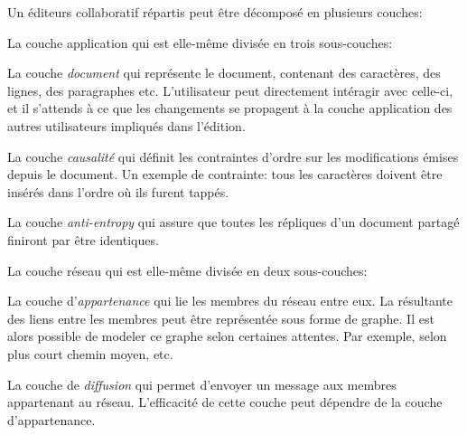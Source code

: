 Un éditeurs collaboratif répartis peut être décomposé en plusieurs couches:
\begin{asparadesc}
\item [La couche application] qui est elle-même divisée en trois sous-couches:
  \begin{inparaenum}[(i)]
  \item La couche \emph{document} qui représente le document, contenant des
    caractères, des lignes, des paragraphes etc. L'utilisateur peut directement
    intéragir avec celle-ci, et il s'attends à ce que les changements se
    propagent à la couche application des autres utilisateurs impliqués dans
    l'édition.
  \item La couche \emph{causalité} qui définit les contraintes d'ordre sur les
    modifications émises depuis le document. Un exemple de contrainte: tous les
    caractères doivent être insérés dans l'ordre où ils furent tappés.
  \item La couche \emph{anti-entropy} qui assure que toutes les répliques d'un
    document partagé finiront par être identiques.
  \end{inparaenum}
\item [La couche réseau] qui est elle-même divisée en deux sous-couches:
  \begin{inparaenum}[(i)]
  \item La couche d'\emph{appartenance} qui lie les membres du réseau entre
    eux. La résultante des liens entre les membres peut être représentée sous
    forme de graphe. Il est alors possible de modeler ce graphe selon certaines
    attentes. Par exemple, selon plus court chemin moyen, etc.
  \item La couche de \emph{diffusion} qui permet d'envoyer un message aux
    membres appartenant au réseau. L'efficacité de cette couche peut dépendre
    de la couche d'appartenance.
  \end{inparaenum}
\end{asparadesc}



